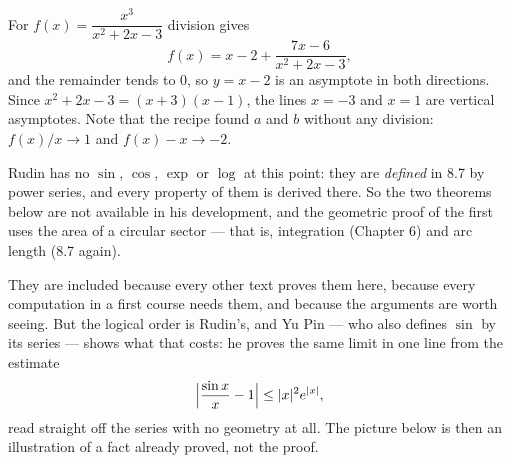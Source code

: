 \begin{center}
\end{center}

\begin{unpack}
For $f(x) = \dfrac{x^3}{x^2+2x-3}$ division gives
\[ f(x) = x-2 + \frac{7x-6}{x^2+2x-3}, \]
and the remainder tends to $0$, so $y = x-2$ is an asymptote in both
directions. Since $x^2+2x-3 = (x+3)(x-1)$, the lines $x=-3$ and $x=1$ are
vertical asymptotes. Note that the recipe found $a$ and $b$ without any
division: $f(x)/x \to 1$ and $f(x)-x \to -2$.
\end{unpack}


\begin{pitfall}
Rudin has no $\sin$, $\cos$, $\exp$ or $\log$ at this point: they are
\emph{defined} in 8.7 by power series, and every property of them is derived
there. So the two theorems below are not available in his development, and
the geometric proof of the first uses the area of a circular sector --- that
is, integration (Chapter 6) and arc length (8.7 again).

They are included because every other text proves them here, because every
computation in a first course needs them, and because the arguments are
worth seeing. But the logical order is Rudin's, and Yu Pin --- who also
defines $\sin$ by its series --- shows what that costs: he proves the same
limit in one line from the estimate
\[ \Bigl|\frac{\sin x}{x} - 1\Bigr| \le |x|^2 e^{|x|}, \]
read straight off the series with no geometry at all. The picture below is
then an illustration of a fact already proved, not the proof.
\end{pitfall}


